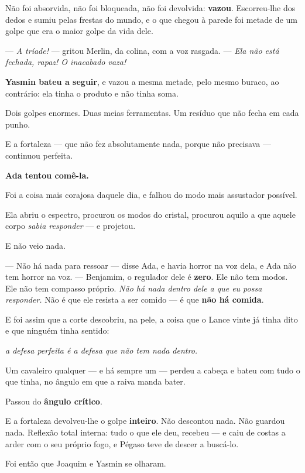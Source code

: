 \documentclass[livro.tex]{subfiles}
\begin{document}
Não foi absorvida, não foi bloqueada, não foi devolvida: \textbf{vazou}. Escorreu-lhe dos dedos e sumiu pelas
frestas do mundo, e o que chegou à parede foi metade de um golpe que era o maior golpe da vida dele.

--- \emph{A tríade!} --- gritou Merlin, da colina, com a voz rasgada. --- \emph{Ela não está fechada, rapaz! O
inacabado vaza!}

\textbf{Yasmin bateu a seguir}, e vazou a mesma metade, pelo mesmo buraco, ao contrário: ela tinha o produto e não
tinha soma.

Dois golpes enormes. Duas meias ferramentas. Um resíduo que não fecha em cada punho.

E a fortaleza --- que não fez absolutamente nada, porque não precisava --- continuou perfeita.

\medskip

\textbf{Ada tentou comê-la.}

Foi a coisa mais corajosa daquele dia, e falhou do modo mais assustador possível.

Ela abriu o espectro, procurou os modos do cristal, procurou aquilo a que aquele corpo \emph{sabia responder} --- e
projetou.

E não veio nada.

--- Não há nada para ressoar --- disse Ada, e havia horror na voz dela, e Ada não tem horror na voz. --- Benjamim, o
regulador dele é \textbf{zero}. Ele não tem modos. Ele não tem compasso próprio. \emph{Não há nada dentro dele
a que eu possa responder.} Não é que ele resista a ser comido --- é que \textbf{não há comida}.

E foi assim que a corte descobriu, na pele, a coisa que o Lance vinte já tinha dito e que ninguém tinha sentido:

\emph{a defesa perfeita é a defesa que não tem nada dentro.}

\medskip

Um cavaleiro qualquer --- e há sempre um --- perdeu a cabeça e bateu com tudo o que tinha, no ângulo em que a raiva
manda bater.

Passou do \textbf{ângulo crítico}.

E a fortaleza devolveu-lhe o golpe \textbf{inteiro}. Não descontou nada. Não guardou nada. Reflexão total interna:
tudo o que ele deu, recebeu --- e caiu de costas a arder com o seu próprio fogo, e Pégaso teve de descer a buscá-lo.

\medskip

Foi então que Joaquim e Yasmin se olharam.
\end{document}
